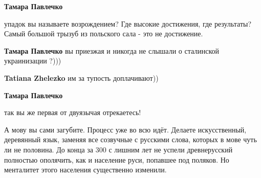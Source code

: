 \begin{itemize}
\begin{itemize}
\textbf{Тамара Павлечко} 

упадок вы называете возрождением? Где высокие достижения, где результаты? Самый
большой трызуб из польского сала - это не достижение.

 
\textbf{Тамара Павлечко} вы приезжая и никогда не слышали о сталинской украинизации ?)))
 
\textbf{Tatiana Zhelezko} им за тупость доплачивают))

 
\textbf{Тамара Павлечко} 

так вы же первая от двуязычая отрекаетесь!

А мову вы сами загубите. Процесс уже во всю идёт. Делаете искусственный,
деревянный язык, заменяя все созвучные с русскими слова, которых в мове чуть ли
не половина. До конца за 300 с лишним лет не успели древнерусский полностью
ополячить, как и население руси, попавшее под поляков. Но менталитет этого
населения существенно изменили.
\end{itemize}

\end{itemize}

